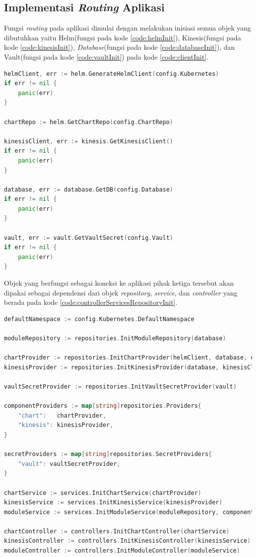 \subsection{Implementasi \textit{Routing} Aplikasi}
\label{sec:router}

Fungsi \textit{routing} pada aplikasi dimulai dengan melakukan inisiasi semua objek yang dibutuhkan yaitu Helm(fungsi pada kode \ref{code:helmInit}), Kinesis(fungsi pada kode \ref{code:kinesisInit}), \textit{Database}(fungsi pada kode \ref{code:databaseInit}), dan Vault(fungsi pada kode \ref{code:vaultInit}) pada kode \ref{code:clientInit}.
\begin{lstlisting}[frame=single,language=Go,caption={Pemanggilan fungsi inisiasi ke \textit{Database}, Helm, Vault, dan Amazon Kinesis},label={code:clientInit}]
helmClient, err := helm.GenerateHelmClient(config.Kubernetes)
if err != nil {
	panic(err)
}

chartRepo := helm.GetChartRepo(config.ChartRepo)

kinesisClient, err := kinesis.GetKinesisClient()
if err != nil {
	panic(err)
}

database, err := database.GetDB(config.Database)
if err != nil {
	panic(err)
}

vault, err := vault.GetVaultSecret(config.Vault)
if err != nil {
	panic(err)
}
\end{lstlisting}
Objek yang berfungsi sebagai koneksi ke aplikasi pihak ketiga tersebut akan dipakai sebagai dependensi dari objek \textit{repository}, \textit{service}, dan \textit{controller} yang berada pada kode  \ref{code:controllerServicesRepositoryInit}. 

\begin{lstlisting}[frame=single,language=Go,caption={Inisiasi \textit{Controller}, \textit{Service}, dan \textit{Repository}},label={code:controllerServicesRepositoryInit}]
defaultNamespace := config.Kubernetes.DefaultNamespace

moduleRepository := repositories.InitModuleRepository(database)

chartProvider := repositories.InitChartProvider(helmClient, database, defaultNamespace, chartRepo)
kinesisProvider := repositories.InitKinesisProvider(database, kinesisClient)

vaultSecretProvider := repositories.InitVaultSecretProvider(vault)

componentProviders := map[string]repositories.Providers{
	"chart":   chartProvider,
	"kinesis": kinesisProvider,
}

secretProviders := map[string]repositories.SecretProviders{
	"vault": vaultSecretProvider,
}

chartService := services.InitChartService(chartProvider)
kinesisService := services.InitKinesisService(kinesisProvider)
moduleService := services.InitModuleService(moduleRepository, componentProviders, secretProviders)

chartController := controllers.InitChartController(chartService)
kinesisController := controllers.InitKinesisController(kinesisService)
moduleController := controllers.InitModuleController(moduleService)
\end{lstlisting}

